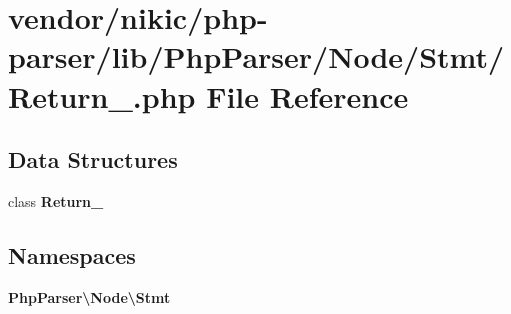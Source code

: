 \section{vendor/nikic/php-\/parser/lib/\+Php\+Parser/\+Node/\+Stmt/\+Return\+\_\+.php File Reference}
\label{_return___8php}
\subsection*{Data Structures}
\begin{DoxyCompactItemize}
\item 
class {\bf Return\+\_\+}
\end{DoxyCompactItemize}
\subsection*{Namespaces}
\begin{DoxyCompactItemize}
\item 
 {\bf Php\+Parser\textbackslash{}\+Node\textbackslash{}\+Stmt}
\end{DoxyCompactItemize}
